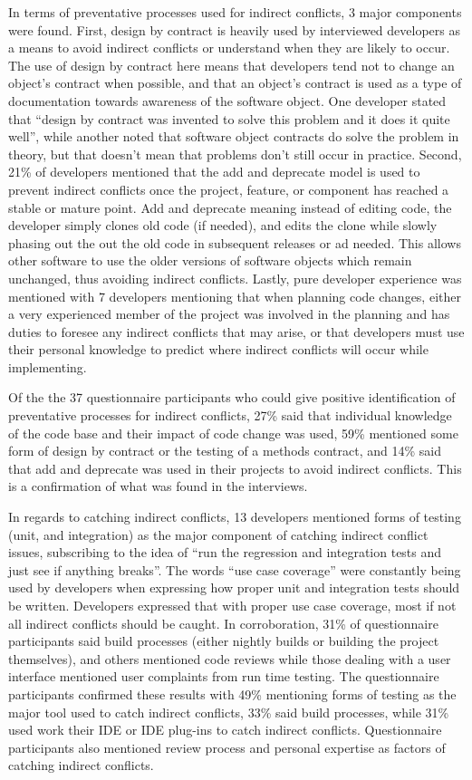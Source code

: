 In terms of preventative processes used for indirect conflicts, 3 major components were found.
First, design by contract is heavily used by interviewed developers as a means to avoid indirect conflicts or understand
when they are likely to occur. The use of design by contract here means that developers tend not to change an object's
contract when possible, and that an object's contract is used as a type of documentation towards awareness of the
software object. One developer stated that ``design by contract was invented to solve this problem and it does it
quite well'', while another noted that software object contracts do solve the problem in theory, but that doesn't
mean that problems don't still occur in practice.
Second, 21\% of developers mentioned that the add and deprecate
model is used to prevent indirect conflicts once
the project, feature, or component has reached a stable or mature point.
Add and deprecate meaning instead of editing code, the developer simply clones old code (if needed), and edits the clone
while slowly phasing out the out the old code in subsequent releases or ad needed. This allows other software to
use the older versions of software objects which remain unchanged, thus avoiding indirect conflicts.
Lastly, pure developer experience was mentioned with 7 developers mentioning that when planning code changes,
either a very experienced member of the project was involved in the planning and has duties to foresee any
indirect conflicts that may arise, or that developers must use their personal knowledge to predict where indirect
conflicts will occur while implementing.

Of the the 37 questionnaire participants who could give positive identification of preventative processes for indirect conflicts,
27\% said that individual knowledge of the code base and their impact of code change was used, 59\% mentioned some form of design
by contract or the testing of a methods contract, and 14\% said that add and
deprecate was used in their projects to avoid indirect conflicts. This is a confirmation of what was found in the interviews.

In regards to catching indirect conflicts, 13 developers mentioned forms of testing (unit, and integration)
as the major component of catching indirect conflict issues, subscribing to the idea of ``run the regression and integration
tests and just see if anything breaks''. The words ``use case coverage'' were constantly being used by developers
when expressing how proper unit and integration tests should be written. Developers expressed that with proper use case coverage, most if
not all indirect conflicts should be caught. In corroboration, 31\% of questionnaire participants said build processes (either nightly builds or building the project
themselves), and others mentioned code reviews while those dealing with a user interface mentioned user complaints from run
time testing. The questionnaire participants confirmed these results with 49\% mentioning forms of testing as the major tool used to
catch indirect conflicts, 33\% said build processes, while 31\% used work their IDE or IDE plug-ins to catch indirect conflicts.
Questionnaire participants also mentioned review process and personal expertise as factors of catching indirect conflicts.

